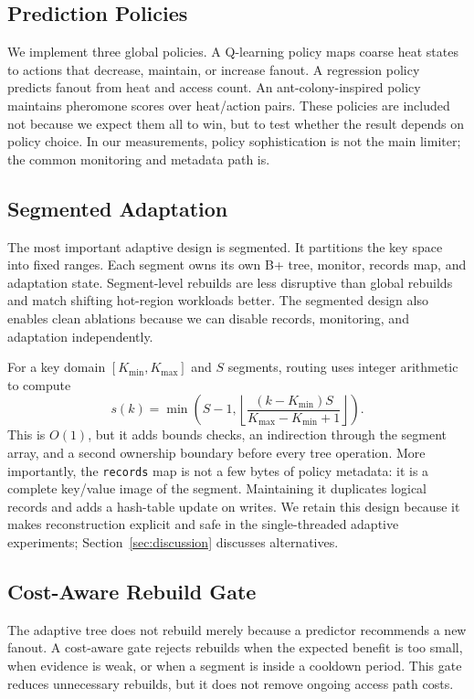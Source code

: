 \documentclass[sigconf,review,anonymous]{acmart}
\begin{document}
\subsection{Prediction Policies}

We implement three global policies.  A Q-learning policy maps coarse heat
states to actions that decrease, maintain, or increase fanout.  A regression
policy predicts fanout from heat and access count.  An ant-colony-inspired
policy maintains pheromone scores over heat/action pairs.  These policies are
included not because we expect them all to win, but to test whether the result
depends on policy choice.  In our measurements, policy sophistication is not
the main limiter; the common monitoring and metadata path is.

\subsection{Segmented Adaptation}

The most important adaptive design is segmented.  It partitions the key space
into fixed ranges.  Each segment owns its own B+ tree, monitor, records map,
and adaptation state.  Segment-level rebuilds are less disruptive than global
rebuilds and match shifting hot-region workloads better.  The segmented design
also enables clean ablations because we can disable records, monitoring, and
adaptation independently.

For a key domain \([K_{\min},K_{\max}]\) and \(S\) segments, routing uses
integer arithmetic to compute
\[
  s(k)=\min\!\left(S-1,
    \left\lfloor\frac{(k-K_{\min})S}
    {K_{\max}-K_{\min}+1}\right\rfloor\right).
\]
This is \(O(1)\), but it adds bounds checks, an indirection through the segment
array, and a second ownership boundary before every tree operation.  More
importantly, the \texttt{records} map is not a few bytes of policy metadata:
it is a complete key/value image of the segment.  Maintaining it duplicates
logical records and adds a hash-table update on writes.  We retain this design
because it makes reconstruction explicit and safe in the single-threaded
adaptive experiments; Section~\ref{sec:discussion} discusses alternatives.

\subsection{Cost-Aware Rebuild Gate}

The adaptive tree does not rebuild merely because a predictor recommends a new
fanout.  A cost-aware gate rejects rebuilds when the expected benefit is too
small, when evidence is weak, or when a segment is inside a cooldown period.
This gate reduces unnecessary rebuilds, but it does not remove ongoing access
path costs.
\end{document}
